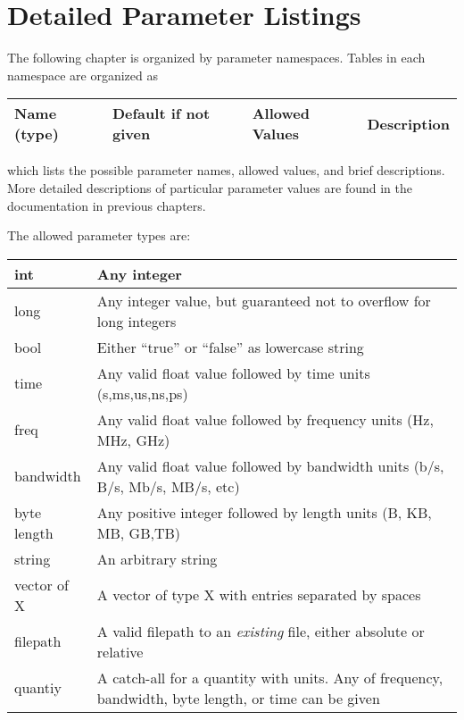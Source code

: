 
\newcommand{\openTable}{\begin{tabular}{| p{5cm} | p{2cm} | p{3cm} | p{8cm} |}}
\newcommand{\paramType}[1]{\newline (#1)}
\pagestyle{empty}

\chapter{Detailed Parameter Listings}
\label{chapter:parameters}
The following chapter is organized by parameter namespaces. Tables in each namespace are organized as
\def\arraystretch{1.5}%

\openTable
\hline
Name (type) & Default if not given & Allowed \newline Values & Description \\
\hline
\end{tabular}

which lists the possible parameter names, allowed values, and brief descriptions.
More detailed descriptions of particular parameter values are found in the documentation in previous chapters.

The allowed parameter types are:

\begin{tabular}{| l | l |}
\hline
int & Any integer \\
\hline
long & Any integer value, but guaranteed not to overflow for long integers \\
\hline
bool & Either ``true'' or ``false'' as lowercase string \\
\hline
time & Any valid float value followed by time units (s,ms,us,ns,ps) \\
\hline
freq & Any valid float value followed by frequency units (Hz, MHz, GHz) \\
\hline
bandwidth & Any valid float value followed by bandwidth units (b/s, B/s, Mb/s, MB/s, etc) \\
\hline
byte length & Any positive integer followed by length units (B, KB, MB, GB,TB) \\
\hline
string & An arbitrary string \\
\hline
vector of X & A vector of type X with entries separated by spaces \\
\hline
filepath & A valid filepath to an \emph{existing} file, either absolute or relative \\
\hline
quantiy & A catch-all for a quantity with units. Any of frequency, bandwidth, byte length, or time can be given \\
\hline
\end{tabular}
